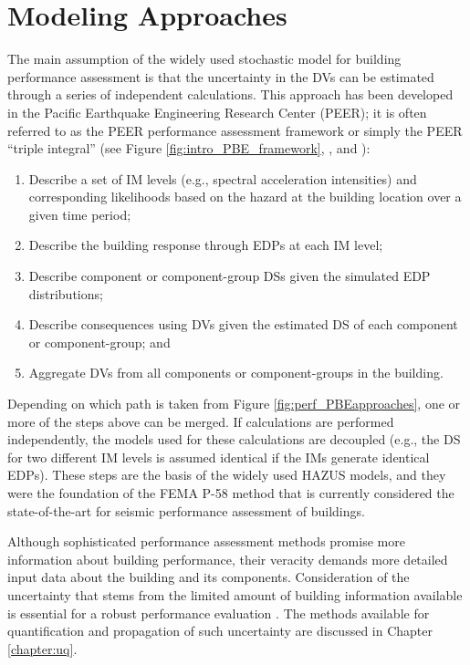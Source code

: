 \section{Modeling Approaches}
\label{sec:perf_bldg_methods}

The main assumption of the widely used stochastic model for building performance assessment is that the uncertainty in the DVs can be estimated through a series of independent calculations. This approach has been developed in the Pacific Earthquake Engineering Research Center (PEER); it is often referred to as the PEER performance assessment framework or simply the PEER ``triple integral'' (see Figure \ref{fig:intro_PBE_framework}, \cite{moehle2004framework}, and \cite{porter2001assemblybased}):

\begin{enumerate}
    \item Describe a set of IM levels (e.g., spectral acceleration intensities) and corresponding likelihoods based on the hazard at the building location over a given time period;

    \item Describe the building response through EDPs at each IM level;

    \item Describe component or component-group DSs given the simulated EDP distributions;

    \item Describe consequences using DVs given the estimated DS of each component or component-group; and

    \item Aggregate DVs from all components or component-groups in the building.
\end{enumerate}

Depending on which path is taken from Figure \ref{fig:perf_PBEapproaches}, one or more of the steps above can be merged. If calculations are performed independently, the models used for these calculations are decoupled (e.g., the DS for two different IM levels is assumed identical if the IMs generate identical EDPs). These steps are the basis of the widely used HAZUS models, and they were the foundation of the FEMA P-58 method that is currently considered the state-of-the-art for seismic performance assessment of buildings.

Although sophisticated performance assessment methods promise more information about building performance, their veracity demands more detailed input data about the building and its components. Consideration of the uncertainty that stems from the limited amount of building information available is essential for a robust performance evaluation \citep{bradley2013critical}. The methods available for quantification and propagation of such uncertainty are discussed in Chapter \ref{chapter:uq}.

